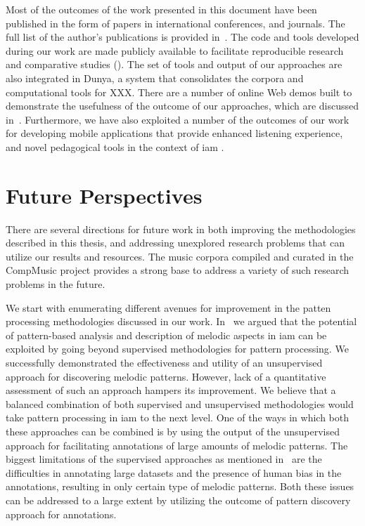 Most of the outcomes of the work presented in this document have been published in the form of papers in international conferences, and journals. The full list of the author’s publications is provided in~. The code and tools developed during our work are made publicly available to facilitate reproducible research and comparative studies (). The set of tools and output of our approaches are also integrated in Dunya, a system that consolidates the corpora and computational tools for XXX. There are a number of online Web demos built to demonstrate the usefulness of the outcome of our approaches, which are discussed in~\secref{}. Furthermore, we have also exploited a number of the outcomes of our work for developing mobile applications that provide enhanced listening experience, and novel pedagogical tools in the context of \gls{iam} \secref{}.


\section{Future Perspectives}
\label{sec:future_directions}

There are several directions for future work in both improving the methodologies described in this thesis, and addressing unexplored research problems that can utilize our results and resources. The music corpora compiled and curated in the CompMusic project provides a strong base to address a variety of such research problems in the future.

We start with enumerating different avenues for improvement in the patten processing methodologies discussed in our work. In~ we argued that the potential of pattern-based analysis and description of melodic aspects in \gls{iam} can be exploited by going beyond supervised methodologies for pattern processing. We successfully demonstrated the effectiveness and utility of an unsupervised approach for discovering melodic patterns. However, lack of a quantitative assessment of such an approach hampers its improvement. We believe that a balanced combination of both supervised and unsupervised methodologies would take pattern processing in \gls{iam} to the next level. One of the ways in which both these approaches can be combined is by using the output of the unsupervised approach for facilitating annotations of large amounts of melodic patterns. The biggest limitations of the supervised approaches as mentioned in~ are the difficulties in annotating large datasets and the presence of human bias in the annotations, resulting in only certain type of melodic patterns. Both these issues can be addressed to a large extent by utilizing the outcome of pattern discovery approach for annotations.

